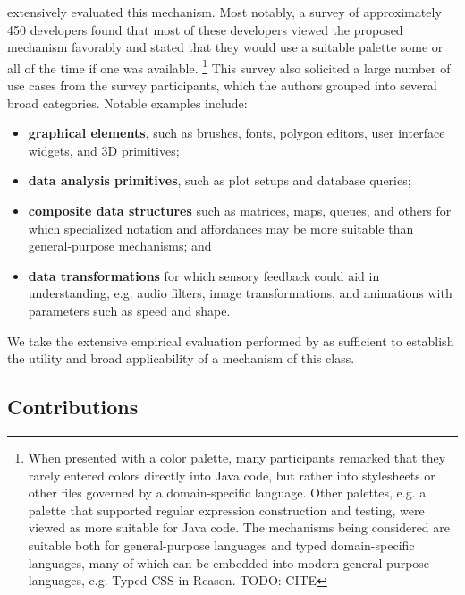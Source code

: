 \citet{Graphite} extensively evaluated this mechanism.
Most notably, a survey of approximately 450 developers found that
most of these developers viewed the proposed mechanism favorably and stated that they
would use a suitable palette some or all of the time if one was available.%
\footnote{When presented with a color palette,
many participants remarked that they rarely entered colors directly into Java code,
but rather into stylesheets or other files governed by a domain-specific language.
Other palettes, e.g. a palette
that supported regular expression construction and testing, were viewed as more
suitable for Java code.
The mechanisms being considered are suitable both for general-purpose languages
and typed domain-specific languages, many of which can be embedded into modern
general-purpose languages, e.g. Typed CSS in Reason. TODO: CITE}
This survey also solicited a large number of use cases from the survey participants,
which the authors grouped into several broad categories. Notable examples include:
\begin{itemize}
  \item \textbf{graphical elements}, such as brushes, fonts, polygon editors, user interface widgets, and 3D primitives;
  \item \textbf{data analysis primitives}, such as plot setups and database queries;
  \item \textbf{composite data structures} such as matrices, maps, queues, and others for which specialized notation and affordances may be more suitable than general-purpose mechanisms; and
  \item \textbf{data transformations} for which sensory feedback could aid in understanding,
  e.g. audio filters, image transformations, and animations with parameters such as speed and shape.
\end{itemize}

We take the extensive empirical evaluation performed by \citet{Graphite} as sufficient to establish
the utility and broad applicability of a mechanism of this class.

\subsection{Contributions}


